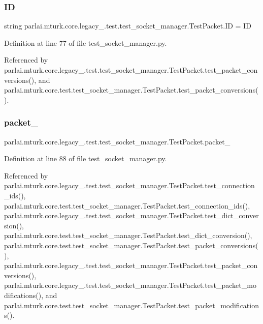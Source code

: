 \subsubsection{\texorpdfstring{ID}{ID}}
{\footnotesize\ttfamily string parlai.\+mturk.\+core.\+legacy\+\_.\+test.\+test\+\_\+socket\+\_\+manager.\+Test\+Packet.\+ID = \textquotesingle{}ID\textquotesingle{}\hspace{0.3cm}{\ttfamily [static]}}



Definition at line 77 of file test\+\_\+socket\+\_\+manager.\+py.



Referenced by parlai.\+mturk.\+core.\+legacy\+\_.\+test.\+test\+\_\+socket\+\_\+manager.\+Test\+Packet.\+test\+\_\+packet\+\_\+conversions(), and parlai.\+mturk.\+core.\+test.\+test\+\_\+socket\+\_\+manager.\+Test\+Packet.\+test\+\_\+packet\+\_\+conversions().

\mbox{\label{classparlai_1_1mturk_1_1core_1_1legacy__2018_1_1test_1_1test__socket__manager_1_1TestPacket_a417cd241ebc95ee79e3d19f125d7870f}} 
\subsubsection{\texorpdfstring{packet\+\_}{packet\_1}}
{\footnotesize\ttfamily parlai.\+mturk.\+core.\+legacy\+\_.\+test.\+test\+\_\+socket\+\_\+manager.\+Test\+Packet.\+packet\+\_}



Definition at line 88 of file test\+\_\+socket\+\_\+manager.\+py.



Referenced by parlai.\+mturk.\+core.\+legacy\+\_.\+test.\+test\+\_\+socket\+\_\+manager.\+Test\+Packet.\+test\+\_\+connection\+\_\+ids(), parlai.\+mturk.\+core.\+test.\+test\+\_\+socket\+\_\+manager.\+Test\+Packet.\+test\+\_\+connection\+\_\+ids(), parlai.\+mturk.\+core.\+legacy\+\_.\+test.\+test\+\_\+socket\+\_\+manager.\+Test\+Packet.\+test\+\_\+dict\+\_\+conversion(), parlai.\+mturk.\+core.\+test.\+test\+\_\+socket\+\_\+manager.\+Test\+Packet.\+test\+\_\+dict\+\_\+conversion(), parlai.\+mturk.\+core.\+test.\+test\+\_\+socket\+\_\+manager.\+Test\+Packet.\+test\+\_\+packet\+\_\+conversions(), parlai.\+mturk.\+core.\+legacy\+\_.\+test.\+test\+\_\+socket\+\_\+manager.\+Test\+Packet.\+test\+\_\+packet\+\_\+conversions(), parlai.\+mturk.\+core.\+legacy\+\_.\+test.\+test\+\_\+socket\+\_\+manager.\+Test\+Packet.\+test\+\_\+packet\+\_\+modifications(), and parlai.\+mturk.\+core.\+test.\+test\+\_\+socket\+\_\+manager.\+Test\+Packet.\+test\+\_\+packet\+\_\+modifications().

